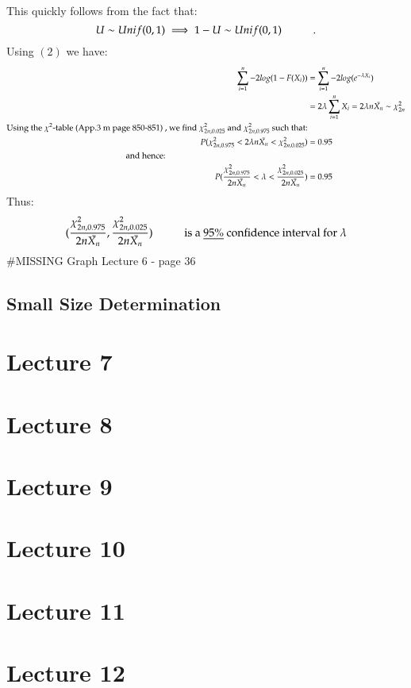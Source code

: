 \documentclass[14pt,twoside,a4paper,fleqn]{article}
\theoremstyle{plain}
\begin{document}
This quickly follows from the fact that:
$$
	U \sim Unif(0,1) \implies 1-U \sim Unif(0,1)\hspace*{1cm} .
$$
Using $(2)$ we have:
\begin{equation*}
\begin{split}
\sum_{i=1}^n -2 log(1-F(X_i)) &= \sum_{i=1}^n -2 log(e^{-\lambda X_i})\\
	&= 2\lambda \sum_{i=1}^n X_i = 2\lambda n \bar{X_n} \sim \chi^2_{2n}\\
	\text{Using the $\chi^2$-table (App.3 m page 850-851) , we find \mbox{$\chi^2_{2n, 0.025}$} and \mbox{$\chi^2_{2n,0.975}$} such that:}\\
	P(\chi^2_{2n,0.975} < 2\lambda n\bar{X_n} < \chi^2_{2n,0.025} ) &= 0.95\\
	\text{and hence:}\tab[6cm]&\\
	P(\frac{\chi^2_{2n, 0.975}}{2n\bar{X_n}} < \lambda < \frac{\chi^2_{2n,0.025}}{2 n \bar{X_n}}) &= 0.95
\end{split}
\end{equation*}
Thus:
$$(\frac{\chi^2_{2n , 0.975}}{2n\bar{X_n}} , \frac{\chi^2_{2n,0.025}}{2n\bar{X_n}})\hspace*{1cm} \text{is a \underline{$95\%$} confidence interval for $\lambda$}
$$
\#MISSING Graph Lecture 6 - page 36
\subsection{Small Size Determination}














\newpage
\section{Lecture 7}
\section{Lecture 8}
\section{Lecture 9}
\section{Lecture 10}
\section{Lecture 11}
\section{Lecture 12}
\end{document}
